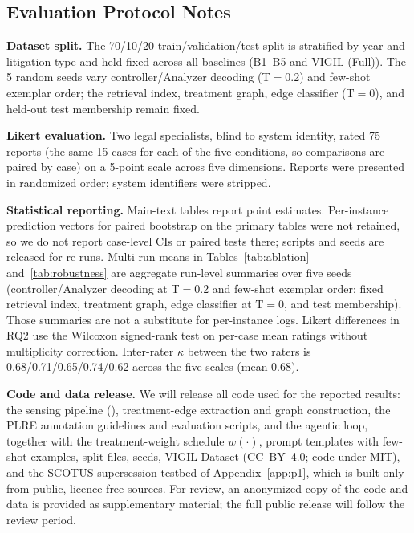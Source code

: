 \subsection{Evaluation Protocol Notes}

\textbf{Dataset split.} The 70/10/20 train/validation/test split is stratified by year and litigation type and held fixed across all baselines (B1--B5 and VIGIL (Full)). The 5 random seeds vary controller/Analyzer decoding (T$=$0.2) and few-shot exemplar order; the retrieval index, treatment graph, edge classifier (T$=$0), and held-out test membership remain fixed.

\textbf{Likert evaluation.} Two legal specialists, blind to system identity, rated 75 reports (the same 15 cases for each of the five conditions, so comparisons are paired by case) on a 5-point scale across five dimensions. Reports were presented in randomized order; system identifiers were stripped.

\textbf{Statistical reporting.} Main-text tables report point estimates. Per-instance prediction vectors for paired bootstrap on the primary tables were not retained, so we do not report case-level CIs or paired tests there; scripts and seeds are released for re-runs. Multi-run means in Tables~\ref{tab:ablation} and~\ref{tab:robustness} are aggregate run-level summaries over five seeds (controller/Analyzer decoding at T$=$0.2 and few-shot exemplar order; fixed retrieval index, treatment graph, edge classifier at T$=$0, and test membership). Those summaries are not a substitute for per-instance logs. Likert differences in RQ2 use the Wilcoxon signed-rank test on per-case mean ratings without multiplicity correction. Inter-rater $\kappa$ between the two raters is 0.68/0.71/0.65/0.74/0.62 across the five scales (mean 0.68).

\textbf{Code and data release.} We will release all code used for the reported results: the sensing pipeline (\trackername{}), treatment-edge extraction and graph construction, the PLRE annotation guidelines and evaluation scripts, and the agentic loop, together with the treatment-weight schedule $w(\cdot)$, prompt templates with few-shot examples, split files, seeds, VIGIL-Dataset (CC~BY~4.0; code under MIT), and the SCOTUS supersession testbed of Appendix~\ref{app:p1}, which is built only from public, licence-free sources. For review, an anonymized copy of the code and data is provided as supplementary material; the full public release will follow the review period.

